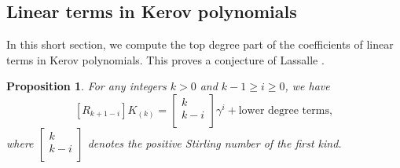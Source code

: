 \documentclass[11pt]{amsart}
\theoremstyle{plain}
\newtheorem{proposition}[lemma]{Proposition}
\theoremstyle{remark}
\begin{document}
\subsection{Linear terms in Kerov polynomials}
\label{SectLinearTerms}

In this short section, we compute the top degree part of the coefficients of linear
terms in Kerov polynomials. 
This proves a conjecture of Lassalle
\cite[page 31]{Lassalle2009}.

\begin{proposition}
For any integers $k > 0$ and $k-1 \geq i \geq 0$, we have
$$[R_{k+1-i}]K_{(k)} = \left[ \begin{matrix} k\\ k-i\\ \end{matrix} \right] \gamma^i
+ \text{lower degree terms},$$
where $\left[ \begin{matrix} k\\ k-i\\ \end{matrix} \right]$ denotes the
positive Stirling number of the first kind.
\end{proposition}
\end{document}

